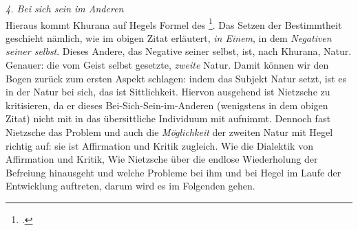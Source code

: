 \documentclass[12pt, a4paper, openany]{report}
\begin{document}
\emph{4. Bei sich sein im Anderen}\\
Hieraus kommt Khurana auf Hegels Formel des \footcite[][283]{khurana_freiheit_2017}.
Das Setzen der Bestimmtheit geschieht nämlich, wie im obigen Zitat erläutert, \emph{in Einem}, in dem \emph{Negativen seiner selbst}. 
Dieses Andere, das Negative seiner selbst, ist, nach Khurana, Natur. 
Genauer: die vom Geist selbst gesetzte, \emph{zweite} Natur.
Damit können wir den Bogen zurück zum ersten Aspekt schlagen: 
indem das Subjekt Natur setzt, ist es in der Natur bei sich, das ist Sittlichkeit.
Hiervon ausgehend ist Nietzsche zu kritisieren, da er dieses Bei-Sich-Sein-im-Anderen (wenigstens in dem obigen Zitat) nicht mit in das übersittliche Individuum mit aufnimmt.  
Dennoch fast Nietzsche das Problem und auch die \emph{Möglichkeit} der zweiten Natur mit Hegel richtig auf: 
sie ist Affirmation und Kritik zugleich.
Wie die Dialektik von Affirmation und Kritik, Wie Nietzsche über die endlose Wiederholung der Befreiung hinausgeht und welche Probleme bei ihm und bei Hegel im Laufe der Entwicklung auftreten, darum wird es im Folgenden gehen.

\begin{comment}
Die folgende Diskussion um Befreiung und zweite Natur wird ihren Ausgangspunkt in der Kritik der Autonomie finden, aus dem ich zu Hegels Begriff der Sittlichkeit kommen werde. 
Es mag merkwürdig anmuten, dass ich gerade mit der Kritik an der Autonomie beginne und hier, als Ausgangspunkt dieser Kritik, den Begriff einer positiven Bestimmung der Freiheit hinterfrage,
wo die Leitfrage meiner Arbeit doch letztendlich auf einen positiven Begriff der Freiheit hinausläuft, auf eine Befreiung, die die Unfreiheit hinter sich lassen kann.
Dennoch und trotzdem, liegt meiner Arbeit, wie den beiden Autoren, zu jeder Zeit Adornos Bestimmung der Freiheit als Befreiung aus der jeweiligen Unfreiheit zu Grunde.
Der Versuch eines Hinausgehen, über den Begriff der Befreiung hinaus oder durch ihn hindurch, hin zu einem positiven Begriff von Freiheit, ist ohne die Kritik an dem positiven Begriff der Freiheit, zum Scheitern verurteilt.
Meine Vorstellung eines positiv bestimmten Freiheitsbegriffs, oder die Befreiung über die Befreiung hinaus, ist die Befreiung, die sich als Unfreiheit weiß; die Befreiung also, die positiv bestimmt ist, aber nur in der Negation realisiert werden kann. 
\end{comment}
\end{document}

